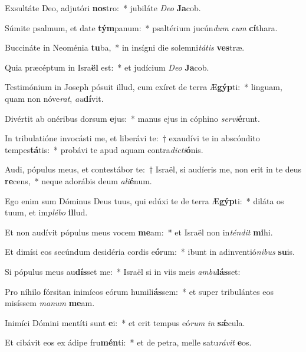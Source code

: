 \item Exsultáte Deo, adjutóri \textbf{nos}tro:~* jubiláte \textit{De}\textit{o} \textbf{Ja}cob.
\item Súmite psalmum, et date \textbf{tým}panum:~* psaltérium jucún\textit{dum} \textit{cum} \textbf{cí}thara.
\item Buccináte in Neoménia \textbf{tu}ba,~* in insígni die solemni\textit{tá}\textit{tis} \textbf{ves}træ.
\item Quia præcéptum in Isra\textbf{ël} est:~* et judícium \textit{De}\textit{o} \textbf{Ja}cob.
\item Testimónium in Joseph pósuit illud, cum exíret de terra Æ\textbf{gýp}ti:~* linguam, quam non nóve\textit{rat}, \textit{au}\textbf{dí}vit.
\item Divértit ab onéribus dorsum \textbf{e}jus:~* manus ejus in cóphino \textit{ser}\textit{vi}\textbf{é}runt.
\item In tribulatióne invocásti me, et liberávi te:~† exaudívi te in abscóndito tempes\textbf{tá}tis:~* probávi te apud aquam contra\textit{dic}\textit{ti}\textbf{ó}nis.
\item Audi, pópulus meus, et contestábor te:~† Israël, si audíeris me, non erit in te deus \textbf{re}cens,~* neque adorábis deum \textit{a}\textit{li}\textbf{é}num.
\item Ego enim sum Dóminus Deus tuus, qui edúxi te de terra Æ\textbf{gýp}ti:~* diláta os tuum, et im\textit{plé}\textit{bo} \textbf{il}lud.
\item Et non audívit pópulus meus vocem \textbf{me}am:~* et Israël non in\textit{tén}\textit{dit} \textbf{mi}hi.
\item Et dimísi eos secúndum desidéria cordis e\textbf{ó}rum:~* ibunt in adinventió\textit{ni}\textit{bus} \textbf{su}is.
\item Si pópulus meus au\textbf{dís}set me:~* Israël si in viis meis \textit{am}\textit{bu}\textbf{lás}set:
\item Pro níhilo fórsitan inimícos eórum humili\textbf{ás}sem:~* et super tribulántes eos misíssem \textit{ma}\textit{num} \textbf{me}am.
\item Inimíci Dómini mentíti sunt \textbf{e}i:~* et erit tempus eó\textit{rum} \textit{in} \textbf{sǽ}cula.
\item Et cibávit eos ex ádipe fru\textbf{mén}ti:~* et de petra, melle satu\textit{rá}\textit{vit} \textbf{e}os.
